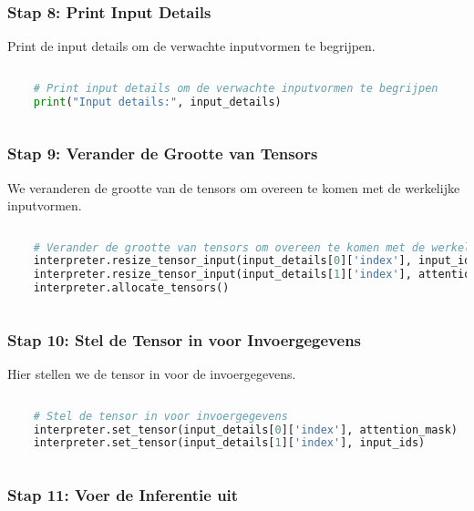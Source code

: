 \subsubsection{Stap 8: Print Input Details}

Print de input details om de verwachte inputvormen te begrijpen.

\begin{lstlisting}[language=Python, caption={Print input details}]
    
    # Print input details om de verwachte inputvormen te begrijpen
    print("Input details:", input_details)
    
\end{lstlisting}

\subsubsection{Stap 9: Verander de Grootte van Tensors}

We veranderen de grootte van de tensors om overeen te komen met de werkelijke inputvormen.

\begin{lstlisting}[language=Python, caption={Verander de grootte van tensors}]
    
    # Verander de grootte van tensors om overeen te komen met de werkelijke inputvormen
    interpreter.resize_tensor_input(input_details[0]['index'], input_ids.shape)
    interpreter.resize_tensor_input(input_details[1]['index'], attention_mask.shape)
    interpreter.allocate_tensors()
    
\end{lstlisting}

\subsubsection{Stap 10: Stel de Tensor in voor Invoergegevens}

Hier stellen we de tensor in voor de invoergegevens.

\begin{lstlisting}[language=Python, caption={Stel de tensor in voor invoergegevens}]
    
    # Stel de tensor in voor invoergegevens
    interpreter.set_tensor(input_details[0]['index'], attention_mask)
    interpreter.set_tensor(input_details[1]['index'], input_ids)
    
\end{lstlisting}

\subsubsection{Stap 11: Voer de Inferentie uit}

